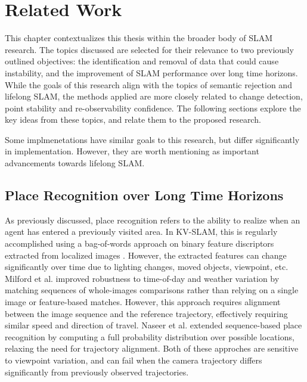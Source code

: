 \section{Related Work}
\label{sec:related_work}

This chapter contextualizes this thesis within the broader body of SLAM research. The topics discussed are selected for their relevance to two previously outlined objectives: the identification and removal of data that could cause instability, and the improvement of SLAM performance over long time horizons. While the goals of this research align with the topics of semantic rejection and lifelong SLAM, the methods applied are more closely related to change detection, point stability and re-observability confidence. The following sections explore the key ideas from these topics, and relate them to the proposed research.

Some implmenetations have similar goals to this research, but differ significantly in implementation. However, they are worth mentioning as important advancements towards lifelong SLAM.

\subsection{Place Recognition over Long Time Horizons}

As previously discussed, place recognition refers to the ability to realize when an agent has entered a previously visited area. In KV-SLAM, this is regularly accomplished using a bag-of-words approach on binary feature discriptors extracted from localized images \cite{camposORBSLAM3AccurateOpenSource2021}. However, the extracted features can change significantly over time due to lighting changes, moved objects, viewpoint, etc. Milford et al. improved robustness to time-of-day and weather variation by matching sequences of whole-images comparisons rather than relying on a single image or feature-based matches. However, this approach requires alignment between the image sequence and the reference trajectory, effectively requiring similar speed and direction of travel. Naseer et al. \cite{naseerVisionbasedMarkovLocalization2015} extended sequence-based place recognition by computing a full probability distribution over possible locations, relaxing the need for trajectory alignment. Both of these approches are sensitive to viewpoint variation, and can fail when the camera trajectory differs significantly from previously observed trajectories.

